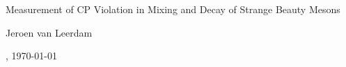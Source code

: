 \thispagestyle{empty}
\begin{center}

  \huge
  Measurement of CP Violation in Mixing and Decay of Strange Beauty Mesons\\


  \Large
  Jeroen van Leerdam


  \normalsize
  \currenttime, \today

\end{center}

\newpage
\thispagestyle{empty}
\cleardoublepage

